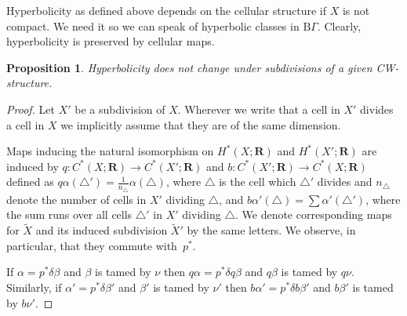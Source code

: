 \documentclass[12pt,reqno,a4paper]{amsart}
\newtheorem{proposition}[subsection]{Proposition}
\theoremstyle{definition}
\theoremstyle{remark}
\numberwithin{equation}{section}
\numberwithin{figure}{section}
\newcommand{\B}[1]{{\mathbf #1}}
\newcommand{\R}{\mathrm}
\begin{document}
Hyperbolicity as defined above depends on the cellular structure if $X$ is not compact.
We need it so we can speak of hyperbolic classes in $\R B\Gamma$.
Clearly, hyperbolicity is preserved by cellular maps.

\begin{proposition}\label{P:subdivision}Hyperbolicity does not
change under subdivisions of a given CW-structure.
\end{proposition}

\begin{proof}
Let  $X'$ be a subdivision of $X$.  Wherever we write that a cell in $X'$ divides a cell in $X$
we implicitly assume that they are of the same dimension.

Maps inducing the natural isomorphism on $H^*(X;\B R)$ and $H^*(X';\B R)$ are induced by
$q\colon C^*(X;\B R)\to C^*(X';\B R)$ and $b\colon C^*(X';\B R)\to C^*(X;\B R)$ defined
as $q\alpha(\triangle')=\frac1{n_\triangle}\alpha(\triangle)$, where $\triangle$ is the cell
which $\triangle'$ divides and $n_\triangle$ denote the
number of cells in $X'$ dividing $\triangle$,
and $b\alpha'(\triangle)=\sum\alpha'(\triangle')$, where the sum runs over all cells $\triangle'$ in $X'$
dividing $\triangle$.
We denote corresponding maps for $\widetilde X$ and its induced subdivision $\widetilde X'$ by the same letters.
We observe, in particular, that they commute with~$p^*$.

If $\alpha=p^*\delta\beta$ and $\beta$ is tamed by $\nu$ then $q\alpha=p^*\delta q\beta$ and $q\beta$ is tamed by $q\nu$.
Similarly, if $\alpha'=p^*\delta\beta'$ and $\beta'$ is tamed by $\nu'$ then $b\alpha'=p^*\delta b\beta'$ and $b\beta'$ is tamed by $b\nu'$.
%
% 
% 
% 
\end{proof}
\end{document}

